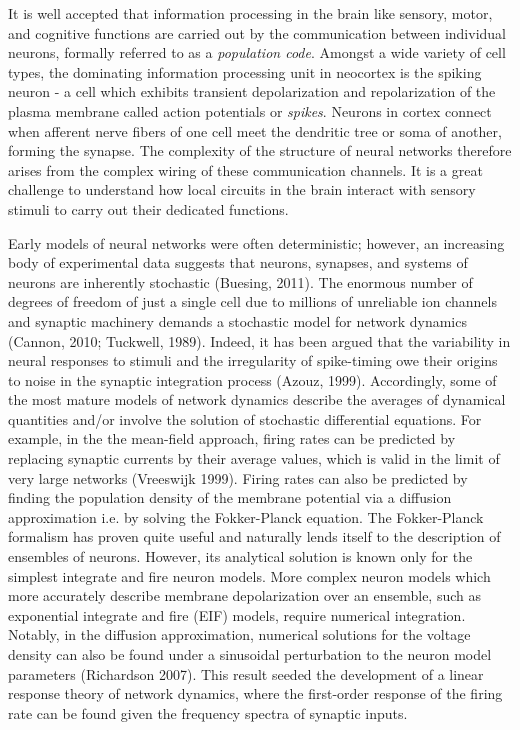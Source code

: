 \documentclass{ucetd}
\begin{document}
It is well accepted that information processing in the brain like sensory, motor, and cognitive functions are carried out by the communication between individual neurons, formally referred to as a \emph{population code}. Amongst a wide variety of cell types, the dominating information processing unit in neocortex is the spiking neuron - a  cell which exhibits transient depolarization and repolarization of the plasma membrane called action potentials or \emph{spikes}.  Neurons in cortex connect when afferent nerve fibers of one cell meet the dendritic tree or soma of another, forming the synapse. The complexity of the structure of neural networks therefore arises from the complex wiring of these communication channels. It is a great challenge to understand how local circuits in the brain interact with sensory stimuli to carry out their dedicated functions.

Early models of neural networks were often deterministic; however, an increasing body of experimental data suggests that neurons, synapses, and systems of neurons are inherently stochastic (Buesing, 2011). The enormous number of degrees of freedom of just a single cell due to millions of unreliable ion channels and synaptic machinery demands a stochastic model for network dynamics (Cannon, 2010; Tuckwell, 1989). Indeed, it has been argued that the variability in neural responses to stimuli and the irregularity of spike-timing owe their origins to noise in the synaptic integration process (Azouz, 1999). Accordingly, some of the most mature models of network dynamics describe the averages of dynamical quantities and/or involve the solution of stochastic differential equations. For example, in the the mean-field approach, firing rates can be predicted by replacing synaptic currents by their average values, which is valid in the limit of very large networks (Vreeswijk 1999). Firing rates can also be predicted by finding the population density of the membrane potential via a diffusion approximation i.e. by solving the Fokker-Planck equation. The Fokker-Planck formalism has proven quite useful and naturally lends itself to the description of ensembles of neurons. However, its analytical solution is known only for the simplest integrate and fire neuron models. More complex neuron models which more accurately describe membrane depolarization over an ensemble, such as exponential integrate and fire (EIF) models, require numerical integration. Notably, in the diffusion approximation, numerical solutions for the voltage density can also be found under a sinusoidal perturbation to the neuron model parameters (Richardson 2007). This result seeded the development of a linear response theory of network dynamics, where the first-order response of the firing rate can be found given the frequency spectra of synaptic inputs.
\end{document}

